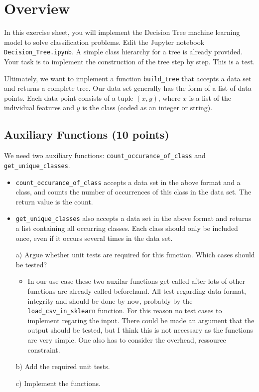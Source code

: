 \documentclass{article}
\begin{document}
\thispagestyle{page1} 

\section{Overview}

In this exercise sheet, you will implement the Decision Tree machine learning model to solve classification problems. 
Edit the Jupyter notebook \texttt{Decision\_Tree.ipynb}. A simple class hierarchy for a tree is already provided.
Your task is to implement the construction of the tree step by step. This is a test.

Ultimately, we want to implement a function \texttt{build\_tree} that accepts a data set and returns a complete tree. 
Our data set generally has the form of a list of data points. Each data point consists of a tuple $(x,y)$, where $x$ is a list of the individual features and $y$ is the class (coded as an integer or string). 

\subsection{Auxiliary Functions (10 points)}

We need two auxiliary functions: \texttt{count\_occurance\_of\_class} and \texttt{get\_unique\_classes}. 

\begin{itemize}
\item \texttt{count\_occurance\_of\_class} accepts a data set in the above format and a class, and counts the number of occurrences of this class in the data set. The return value is the count.
\item \texttt{get\_unique\_classes} also accepts a data set in the above format and returns a list containing all occurring classes. Each class should only be included once, even if it occurs several times in the data set. 
\end{itemize}

\begin{enumerate}

\item[a)] Argue whether unit tests are required for this function. Which cases should be tested?
\begin{itemize}
    \item In our use case these two auxilar functions get called after lots of other functions are already called beforehand.
    All test regarding data format, integrity and should be done by now, probably by the \texttt{load\_csv\_in\_sklearn} function. For this reason no test cases to implement regaring the input.
    There could be made an argument that the output should be tested, but I think this is not necessary as the functions are very simple. One also has to consider the overhead, ressource constraint.
\end{itemize}
\item[b)] Add the required unit tests.

\item[c)] Implement the functions.

\end{enumerate}
\end{document}
